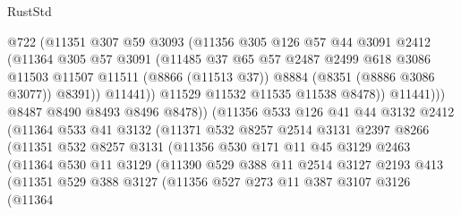 \begin{lexlean}{RustStd}
\begin{coremodule}
                      @722
                      (@11351
                        @307
                        @59
                        @3093
                        (@11356
                          @305
                          @126
                          @57
                          @44
                          @3091
                          @2412
                          (@11364
                            @305
                            @57
                            @3091
                            (@11485
                              @37
                              @65
                              @57
                              @2487
                              @2499
                              @618
                              @3086
                              @11503
                              @11507
                              @11511
                              (@8866 (@11513 @37))
                              @8884
                              (@8351 (@8886 @3086 @3077))
                              @8391))
                          @11441))
                      @11529
                      @11532
                      @11535
                      @11538
                      @8478))
                  @11441)))
            @8487
            @8490
            @8493
            @8496
            @8478))
        (@11356
          @533
          @126
          @41
          @44
          @3132
          @2412
          (@11364
            @533
            @41
            @3132
            (@11371
              @532
              @8257
              @2514
              @3131
              @2397
              @8266
              (@11351
                @532
                @8257
                @3131
                (@11356
                  @530
                  @171
                  @11
                  @45
                  @3129
                  @2463
                  (@11364
                    @530
                    @11
                    @3129
                    (@11390
                      @529
                      @388
                      @11
                      @2514
                      @3127
                      @2193
                      @413
                      (@11351
                        @529
                        @388
                        @3127
                        (@11356
                          @527
                          @273
                          @11
                          @387
                          @3107
                          @3126
                          (@11364

\end{coremodule}
\end{lexlean}
